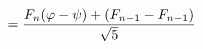 \documentclass[preview]{standalone}
\begin{document}
\begin{align*}
\special{dvisvgm:raw <g id='unique000'>}= \frac{F_n(\varphi - \psi) + (F_{n-1} - F_{n-1})}{\sqrt{5}}\special{dvisvgm:raw </g>}
\end{align*}
\end{document}
